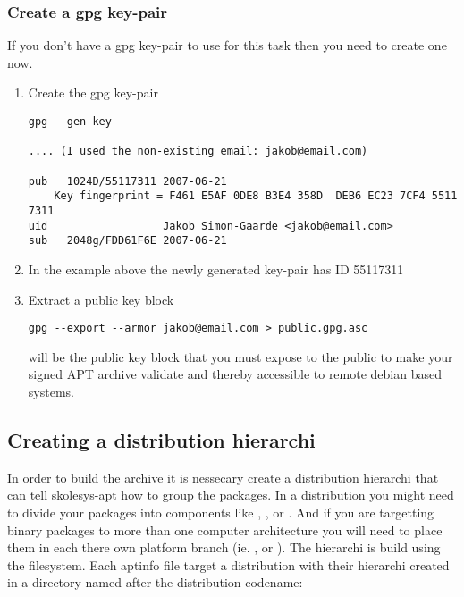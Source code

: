 \subsubsection{Create a gpg key-pair\label{skolesys-apt-creategpg}}
If you don't have a gpg key-pair to use for this task then you need to create one now.
\begin{enumerate}
 \item Create the gpg key-pair
 \begin{verbatim}
gpg --gen-key

.... (I used the non-existing email: jakob@email.com)

pub   1024D/55117311 2007-06-21
	Key fingerprint = F461 E5AF 0DE8 B3E4 358D  DEB6 EC23 7CF4 5511 7311
uid                  Jakob Simon-Gaarde <jakob@email.com>
sub   2048g/FDD61F6E 2007-06-21
 \end{verbatim}

 \item In the example above the newly generated key-pair has ID 55117311
 \item Extract a public key block	
 \begin{verbatim}
gpg --export --armor jakob@email.com > public.gpg.asc
 \end{verbatim}

  will be the public key block that you must expose to the public to make your signed APT archive validate and thereby accessible to remote debian based systems.

\end{enumerate}

\subsection{Creating a distribution hierarchi\label{skolesys-apt-pool}}
In order to build the archive it is nessecary create a distribution hierarchi that can tell skolesys-apt how to group the packages. In a distribution you might need to divide your packages into components like , ,  or . And if you are targetting binary packages to more than one computer architecture you will need to place them in each there own platform branch (ie. ,  or ). The hierarchi is build using the filesystem. Each aptinfo file target a distribution with their hierarchi created in a directory named after the distribution codename:

